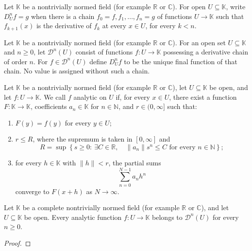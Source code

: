\begin{definition}
\label{def:open-domain-iterated-derivative}
\leanok
Let $\mathbb K$ be a nontrivially normed field (for example $\mathbb R$ or $\mathbb C$).
For open $U\subseteq\mathbb K$, write $D_U^n f=g$ when there is a chain
$f_0=f,f_1,\ldots,f_n=g$ of functions $U\to\mathbb K$ such that $f_{k+1}(x)$
is the derivative of $f_k$ at every $x\in U$, for every $k<n$.
\end{definition}

\begin{definition}
\label{def:open-domain-derivative-value}
\leanok
Let $\mathbb K$ be a nontrivially normed field (for example $\mathbb R$ or $\mathbb C$).
For an open set $U\subseteq\mathbb K$ and $n\ge0$, let $\mathcal D^n(U)$
consist of functions $f:U\to\mathbb K$ possessing a derivative chain of
order $n$. For $f\in\mathcal D^n(U)$ define $D_U^n f$ to be the unique
final function of that chain. No value is assigned without such a chain.
\end{definition}

\begin{definition}
\label{def:open-domain-analytic}
\leanok
Let $\mathbb K$ be a nontrivially normed field (for example $\mathbb R$ or $\mathbb C$), let $U\subseteq\mathbb K$ be open,
and let $f:U\to\mathbb K$. We call $f$ analytic on $U$ if, for every
$x\in U$, there exist a function $F:\mathbb K\to\mathbb K$, coefficients
$a_n\in\mathbb K$ for $n\in\mathbb N$, and $r\in(0,\infty]$ such that:
\begin{enumerate}
\item $F(y)=f(y)$ for every $y\in U$;
\item $r\le R$, where the supremum is taken in $[0,\infty]$ and
\[
 R=\sup\left\{s\ge0:\ \exists C\in\mathbb R,\quad
       \|a_n\|s^n\le C\text{ for every }n\in\mathbb N\right\};
\]
\item for every $h\in\mathbb K$ with $\|h\|<r$, the partial sums
\[
 \sum_{n=0}^{N-1}a_nh^n
\]
converge to $F(x+h)$ as $N\to\infty$.
\end{enumerate}
\end{definition}

\begin{theorem}
\label{thm:open-domain-analytic-derivatives}
\leanok
Let $\mathbb K$ be a complete nontrivially normed field (for example $\mathbb R$ or $\mathbb C$), and let $U\subseteq\mathbb K$ be open.
Every analytic function $f:U\to\mathbb K$ belongs to $\mathcal D^n(U)$
for every $n\ge0$.
\end{theorem}
\begin{proof}
\leanok
\end{proof}


